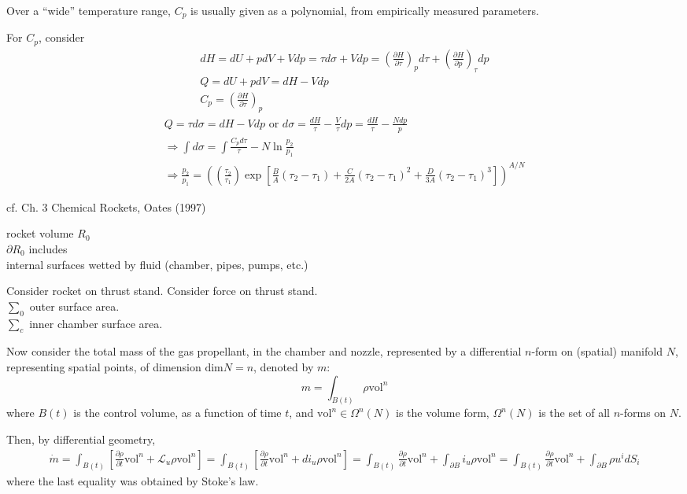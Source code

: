 \documentclass[10pt]{amsart}
\begin{document}
\begin{multicols*}{2}
\hrulefill

Over a ``wide'' temperature range, $C_p$ is usually given as a polynomial, from empirically measured parameters.  

For $C_p$, consider 
\[
\begin{gathered}
  dH = dU + pdV + Vdp = \tau d\sigma + Vdp = \left( \frac{ \partial H}{ \partial \tau} \right)_p d\tau + \left( \frac{ \partial H}{ \partial p} \right)_{\tau} dp \\
  Q = dU + pdV = dH - Vdp \\
  C_p = \left( \frac{ \partial H}{ \partial \tau} \right)_p 
\end{gathered}
\]
\[
\begin{gathered}
  Q = \tau d\sigma = dH - Vdp  \text{ or } d\sigma = \frac{dH}{\tau} - \frac{V}{\tau} dp = \frac{dH}{\tau} - \frac{Ndp}{p} \\
  \Longrightarrow \int d\sigma = \int \frac{C_pd\tau}{\tau} - N \ln{ \frac{p_2}{p_1}} \\
  \Longrightarrow \frac{p_2}{p_1} = \left( \left( \frac{\tau_2}{\tau_1} \right) \exp{ \left[ \frac{B}{A} (\tau_2 - \tau_1) + \frac{C}{2A}(\tau_2 - \tau_1)^2 + \frac{D}{3A}(\tau_2 - \tau_1)^3 \right] } \right)^{A/N}
\end{gathered}
\]


cf. Ch. 3 Chemical Rockets, Oates (1997) \cite{GOAtes1997}

rocket volume $R_0$ \\
$\partial R_0$ includes \\
\phantom{\quad \, } internal surfaces wetted by fluid (chamber, pipes, pumps, etc.) 

Consider rocket on thrust stand.  Consider force on thrust stand.  \\
$\sum_0$ outer surface area. \\
$\sum_c$ inner chamber surface area. 

Now consider the total mass of the gas propellant, in the chamber and nozzle, represented by a differential $n$-form on (spatial) manifold $N$, representing spatial points, of dimension $\text{dim}N=n$, denoted by $m$:
\[
m = \int_{B(t)} \rho \text{vol}^n
\]
where $B(t)$ is the control volume, as a function of time $t$, and $\text{vol}^n \in \Omega^n(N)$ is the volume form, $\Omega^n(N)$ is the set of all $n$-forms on $N$.  

Then, by differential geometry, 
\[
\begin{gathered}
  \dot{m} = \int_{B(t)} \left[ \frac{ \partial \rho }{ \partial t} \text{vol}^n + \mathcal{L}_u \rho \text{vol}^n \right] = \int_{B(t)} \left[ \frac{ \partial \rho }{ \partial t} \text{vol}^n + di_u \rho \text{vol}^n \right]   = \int_{B(t)} \frac{ \partial \rho}{ \partial t} \text{vol}^n + \int_{\partial B} i_u \rho \text{vol}^n = \int_{B(t)} \frac{ \partial \rho }{ \partial t} \text{vol}^n + \int_{\partial B} \rho u^i dS_i
\end{gathered}
\]
where the last equality was obtained by Stoke's law.  


\end{multicols*}
\end{document}
